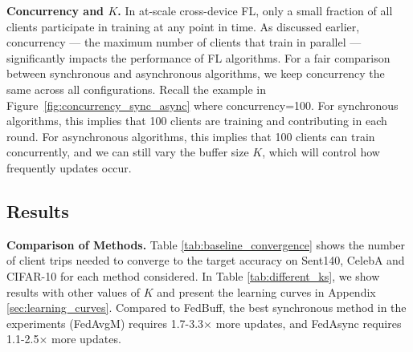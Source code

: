 \documentclass[twoside]{article}
\newcommand{\algname}{{FedBuff}\xspace}
\newcommand{\concurrency}{{concurrency}\xspace}
\begin{document}
\textbf{Concurrency and $K$.}
In at-scale cross-device FL, only a small fraction of all clients participate in training at any point in time. As discussed earlier, concurrency --- the maximum number of clients that train in parallel --- significantly impacts the performance of FL algorithms. 
For a fair comparison between synchronous and asynchronous algorithms, we keep \concurrency{} the same across all configurations. Recall the example in Figure~\ref{fig:concurrency_sync_async} where \concurrency{}=100. For synchronous algorithms, this implies that 100 clients are training and contributing in each round. For asynchronous algorithms, this implies that 100 clients can train concurrently, and we can still vary the buffer size $K$, which will control how frequently updates occur.



\subsection{Results}
\label{subsec:results}

\textbf{Comparison of Methods. }
Table \ref{tab:baseline_convergence} shows the number of client trips needed to converge to the target accuracy on Sent140, CelebA and CIFAR-10 for each method considered. In Table \ref{tab:different_ks}, we show results with other values of $K$ and present the learning curves in Appendix \ref{sec:learning_curves}. Compared to FedBuff, the best synchronous method in the experiments (FedAvgM) requires 1.7-3.3$\times$ more updates, and FedAsync requires 1.1-2.5$\times$ more updates.




\end{document}
